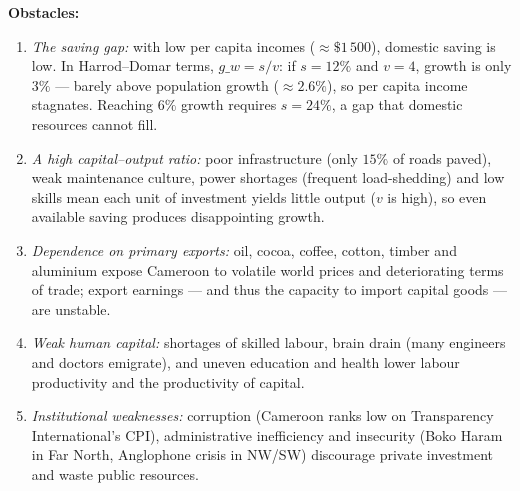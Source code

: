 \documentclass[11pt]{article}
\begin{document}
\begin{corrige}
\textbf{Obstacles:}
\begin{enumerate}
\item \emph{The saving gap:} with low per capita incomes ($\approx \$1\,500$), domestic saving is low. In Harrod--Domar terms, $g\_w = s/v$: if $s = 12\%$ and $v = 4$, growth is only $3\%$ — barely above population growth ($\approx 2.6\%$), so per capita income stagnates. Reaching $6\%$ growth requires $s = 24\%$, a gap that domestic resources cannot fill.
\item \emph{A high capital--output ratio:} poor infrastructure (only $15\%$ of roads paved), weak maintenance culture, power shortages (frequent load-shedding) and low skills mean each unit of investment yields little output ($v$ is high), so even available saving produces disappointing growth.
\item \emph{Dependence on primary exports:} oil, cocoa, coffee, cotton, timber and aluminium expose Cameroon to volatile world prices and deteriorating terms of trade; export earnings — and thus the capacity to import capital goods — are unstable.
\item \emph{Weak human capital:} shortages of skilled labour, brain drain (many engineers and doctors emigrate), and uneven education and health lower labour productivity and the productivity of capital.
\item \emph{Institutional weaknesses:} corruption (Cameroon ranks low on Transparency International's CPI), administrative inefficiency and insecurity (Boko Haram in Far North, Anglophone crisis in NW/SW) discourage private investment and waste public resources.
\end{enumerate}


\end{corrige}
\end{document}
